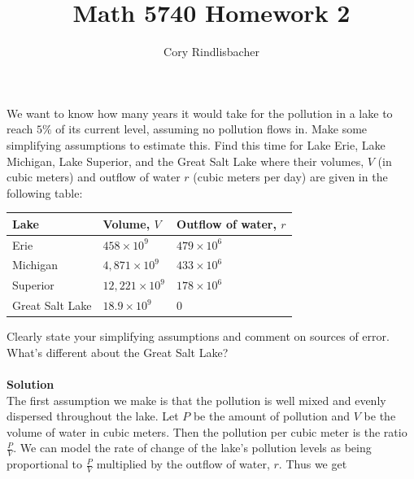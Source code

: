 \documentclass[12pt]{article}
\newenvironment{exercise}[2][Exercise]{\begin{trivlist}
\item[\hskip \labelsep {\bfseries #1}\hskip \labelsep {\bfseries #2.}]}{\end{trivlist}}
\begin{document}
 
 
 
\title{Math 5740 Homework 2}%
\author{Cory Rindlisbacher\\ %
} %
 
\maketitle
 
\begin{exercise}{1} 
We want to know how many years it would take for the pollution in a lake to reach $5\%$ of its current level, assuming no pollution flows in. Make some simplifying assumptions to estimate this. Find this time for Lake Erie, Lake Michigan, Lake Superior, and the Great Salt Lake where their volumes, $V$ (in cubic meters) and outflow of water $r$ (cubic meters per day) are given in the following table: \\
\begin{center}
	\begin{tabular}{lll}
		Lake & Volume, $V$ & Outflow of water, $r$ \\ \hline
		Erie & $458 \times 10^9$ & $479 \times 10^6$ \\
		Michigan & $4,871 \times 10^9$ & $433 \times 10^6$ \\
		Superior & $12,221 \times 10^9$ & $178 \times 10^6$ \\
		Great Salt Lake & $18.9 \times 10^9$ & $0$ \\
	\end{tabular}
\end{center}

Clearly state your simplifying assumptions and comment on sources of error. What's different about the Great Salt Lake?
\\
\\
\textbf{Solution}\\
The first assumption we make is that the pollution is well mixed and evenly dispersed throughout the lake. Let $P$ be the amount of pollution and $V$ be the volume of water in cubic meters. Then the pollution per cubic meter is the ratio $\frac{P}{V}$. We can model the rate of change of the lake's pollution levels as being proportional to $\frac{P}{V}$ multiplied by the outflow of water, $r$. Thus we get 


\end{exercise}
\end{document}
